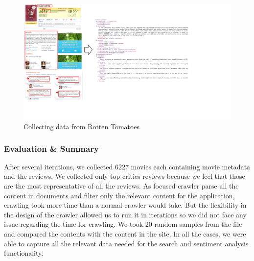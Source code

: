 \begin{figure}[H]
    \centering
    \includegraphics[width=4.5in]{rot.png}
    \caption{Collecting data from Rotten Tomatoes}
    \label{fig:xmlFile}
\end{figure}

\subsubsection{Evaluation \& Summary}
After several iterations, we collected 6227 movies each containing movie metadata and the reviews. We collected only top critics reviews because we feel that those are the most representative of all the reviews. As focused crawler parse all the content in documents and filter only the relevant content for the application, crawling took more time than a normal crawler would take. But the flexibility in the design of the crawler allowed us to run it in iterations so we did not face any issue regarding the time for crawling. We took 20 random samples from the file and compared the contents with the content in the site. In all the cases, we were able to capture all the relevant data needed for the search and sentiment analysis functionality.
